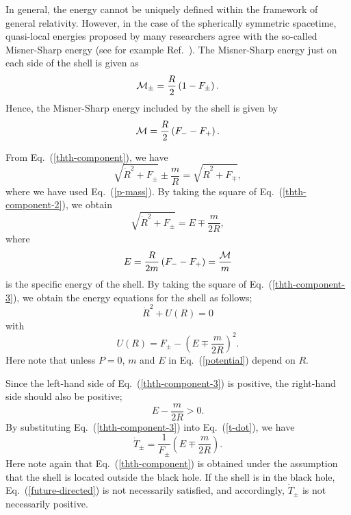\documentclass[aps,preprint,preprintnumber,nofootinbib,amsmath,amssymb,ascmac,bm,12pt]{revtex4}
\begin{document}
In general, the energy cannot be uniquely defined within the framework of general relativity. 
However, in the case of the spherically symmetric spacetime, quasi-local energies proposed by many 
researchers agree with the so-called Misner-Sharp energy (see for example Ref.~\cite{Hayward}). 
The Misner-Sharp energy just on each side of the shell is given as
$$
{\cal M}_\pm=\frac{R}{2}\left(1-F_\pm\right).
$$
Hence, the Misner-Sharp energy included by the shell is given by
\begin{equation}
{\cal M}=\frac{R}{2}\left(F_--F_+\right). \label{MS-energy}
\end{equation}


 
From Eq.~(\ref{thth-component}), we have
\begin{equation}
\sqrt{\dot{R}^2+F_\pm}\pm\frac{m}{R}=\sqrt{\dot{R}^2+F_\mp}, \label{thth-component-2}
\end{equation}
where we have used Eq.~(\ref{p-mass}). 
By taking the square of Eq.~(\ref{thth-component-2}), we obtain
\begin{equation}
\sqrt{\dot{R}^2+F_\pm}=E\mp\frac{m}{2R},
\label{thth-component-3}
\end{equation}
where 
\begin{equation}
E=\frac{R}{2m}\left(F_--F_+\right)=\frac{\cal M}{m}
\label{E-def}
\end{equation}
is the specific energy of the shell. 
By taking the square of Eq.~(\ref{thth-component-3}), we obtain the energy equations for the shell as follows;
\begin{equation}
\dot{R}^2+U(R)=0 \label{E-equation}
\end{equation}
with 
\begin{equation}
U(R)=F_\pm-\left(E\mp\frac{m}{2 R}\right)^2.
\label{potential}
\end{equation}
Here note that unless $P=0$, $m$ and $E$ in Eq.~(\ref{potential}) depend on $R$. 

Since the left-hand side of Eq.~(\ref{thth-component-3}) is positive, the right-hand side should also be positive; 
\begin{equation}
E-\frac{m}{2R}>0.
\label{future-directed}
\end{equation}
By substituting Eq.~(\ref{thth-component-3}) into Eq.~(\ref{t-dot}), we have 
\begin{equation}
\dot{T}_\pm=\frac{1}{F_\pm}\left(E\mp\frac{m}{2R}
\right). \label{t-dot-2}
\end{equation}
Here note again that Eq.~(\ref{thth-component}) is obtained under the assumption that 
the shell is located outside the black hole. If the shell is in the black hole, Eq.~(\ref{future-directed}) 
is not necessarily satisfied, and accordingly, $\dot{T}_\pm$ is not necessarily positive. 
\end{document}
